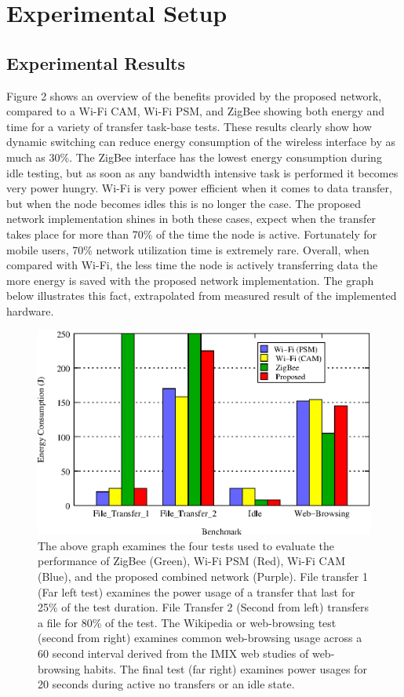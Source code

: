 \documentclass[conference]{IEEEtran}
\begin{document}
\section{Experimental Setup}
\subsection{Experimental Results}

Figure 2 shows an overview of the benefits provided by the proposed network, compared to a Wi-Fi CAM, Wi-Fi PSM, and ZigBee showing both energy and time for a variety of transfer task-base tests. These results clearly show how dynamic switching can reduce energy consumption of the wireless interface by as much as 30\%. The ZigBee interface has the lowest energy consumption during idle testing, but as soon as any bandwidth intensive task is performed it becomes very power hungry.  Wi-Fi is very power efficient when it comes to data transfer, but when the node becomes idles this is no longer the case.  The proposed network implementation shines in both these cases, expect when the transfer takes place for more than 70\% of the time the node is active.  Fortunately for mobile users, 70\% network utilization time is extremely rare.  Overall, when compared with Wi-Fi, the less time the node is actively transferring data the more energy is saved with the proposed network implementation.  The graph below illustrates this fact, extrapolated from measured result of the implemented hardware.

\begin{figure}
\begin{center}
\includegraphics[scale=0.65]{woot.eps}
\caption{The above graph examines the four tests used to evaluate the performance of ZigBee (Green), Wi-Fi PSM (Red), Wi-Fi CAM (Blue), and the proposed combined network (Purple).  File transfer 1 (Far left test) examines the power usage of a transfer that last for 25\% of the test duration.  File Transfer 2 (Second from left) transfers a file for 80\% of the test. The Wikipedia or web-browsing test (second from right) examines common web-browsing usage across a 60 second interval derived from the IMIX web studies of web-browsing habits. \cite{twelve}  The final test (far right) examines power usages for 20 seconds during active no transfers or an idle state.}
\end{center}
\end{figure}
\end{document}
